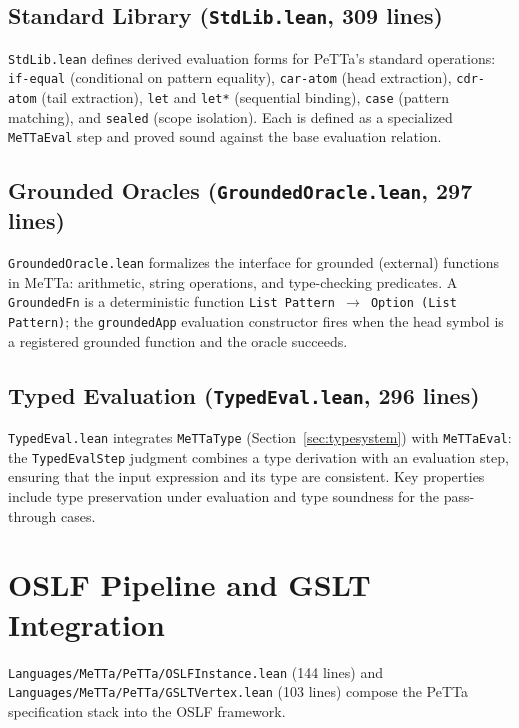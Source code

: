 \documentclass[]{article}
\newcommand{\code}[1]{\texttt{#1}}
\newcommand{\MeTTa}{\textup{MeTTa}}
\newcommand{\PeTTa}{\textup{PeTTa}}
\newcommand{\OSLF}{\textup{OSLF}}
\begin{document}
\subsection{Standard Library (\code{StdLib.lean}, 309 lines)}

\code{StdLib.lean} defines derived evaluation forms for \PeTTa{}'s standard
operations: \code{if-equal} (conditional on pattern equality), \code{car-atom}
(head extraction), \code{cdr-atom} (tail extraction), \code{let} and
\code{let*} (sequential binding), \code{case} (pattern matching), and
\code{sealed} (scope isolation).  Each is defined as a specialized
\code{MeTTaEval} step and proved sound against the base evaluation relation.

\subsection{Grounded Oracles (\code{GroundedOracle.lean}, 297 lines)}

\code{GroundedOracle.lean} formalizes the interface for grounded (external)
functions in \MeTTa{}: arithmetic, string operations, and type-checking predicates.
A \code{GroundedFn} is a deterministic function \code{List Pattern $\to$
Option (List Pattern)}; the \code{groundedApp} evaluation constructor fires
when the head symbol is a registered grounded function and the oracle succeeds.

\subsection{Typed Evaluation (\code{TypedEval.lean}, 296 lines)}

\code{TypedEval.lean} integrates \code{MeTTaType} (Section~\ref{sec:typesystem})
with \code{MeTTaEval}: the \code{TypedEvalStep} judgment combines a type
derivation with an evaluation step, ensuring that the input expression and
its type are consistent.  Key properties include type preservation under
evaluation and type soundness for the pass-through cases.

\section{\OSLF{} Pipeline and GSLT Integration}
\label{sec:oslf}

\code{Languages/MeTTa/PeTTa/OSLFInstance.lean} (144 lines) and
\code{Languages/MeTTa/PeTTa/GSLTVertex.lean} (103 lines) compose the \PeTTa{} specification
stack into the \OSLF{} framework.
\end{document}
